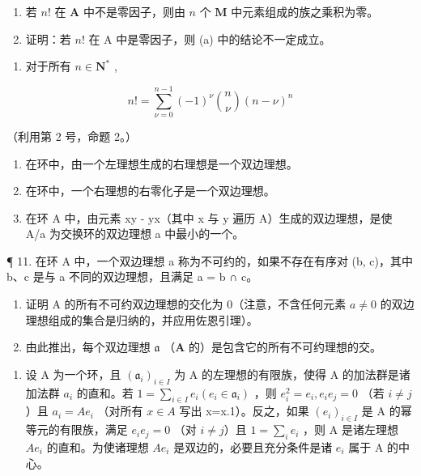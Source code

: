 \begin{enumerate}
\def\labelenumi{(\alph{enumi})}
\item
  若 \(n!\) 在 \(\mathbf{A}\) 中不是零因子，则由 \(n\) 个 \(\mathbf{M}\) 中元素组成的族之乘积为零。
\item
  证明：若 \(n!\) 在 A 中是零因子，则 (a) 中的结论不一定成立。
\end{enumerate}

\begin{enumerate}
\def\labelenumi{\arabic{enumi}.}
\setcounter{enumi}{6}
\tightlist
\item
  对于所有 \(n \in \mathbf{N}^*\) ,
\end{enumerate}

\[
n! = \sum_ {\nu = 0} ^ {n - 1} (- 1) ^ {\nu} \binom {n} {\nu} (n - \nu) ^ {n}
\]

（利用第 2 号，命题 2。）

\begin{enumerate}
\def\labelenumi{\arabic{enumi}.}
\setcounter{enumi}{7}
\item
  在环中，由一个左理想生成的右理想是一个双边理想。
\item
  在环中，一个右理想的右零化子是一个双边理想。
\item
  在环 A 中，由元素 xy - yx（其中 x 与 y 遍历 A）生成的双边理想，是使 A/a 为交换环的双边理想 a 中最小的一个。
\end{enumerate}

¶ 11. 在环 A 中，一个双边理想 a 称为不可约的，如果不存在有序对 (b, c)，其中 b、c 是与 a 不同的双边理想，且满足 a = b ∩ c。

\begin{enumerate}
\def\labelenumi{(\alph{enumi})}
\item
  证明 A 的所有不可约双边理想的交化为 0（注意，不含任何元素 \(a \neq 0\) 的双边理想组成的集合是归纳的，并应用佐恩引理）。
\item
  由此推出，每个双边理想 \(\mathfrak{a}\) （\(\mathbf{A}\) 的）是包含它的所有不可约理想的交。
\end{enumerate}

\begin{enumerate}
\def\labelenumi{\arabic{enumi}.}
\setcounter{enumi}{11}
\tightlist
\item
  设 A 为一个环，且 \((\mathfrak{a}_{i})_{i\in I}\) 为 A 的左理想的有限族，使得 A 的加法群是诸加法群 \(a_{i}\) 的直和。若 \(1=\sum_{i\in I}e_{i}(e_{i}\in\mathfrak{a}_{i})\) ，则 \(e_{i}^{2}=e_{i}, e_{i}e_{j}=0\) （若 \(i\neq j\)）且 \(a_{i}=Ae_{i}\) （对所有 \(x\in A\) 写出 x=x.1）。反之，如果 \((e_{i})_{i\in I}\) 是 A 的幂等元的有限族，满足 \(e_{i}e_{j}=0\) （对 \(i\neq j\)）且 \(1=\sum_{i}e_{i}\) ，则 A 是诸左理想 \(Ae_{i}\) 的直和。为使诸理想 \(Ae_{i}\) 是双边的，必要且充分条件是诸 \(e_{i}\) 属于 A 的中心。
\end{enumerate}

